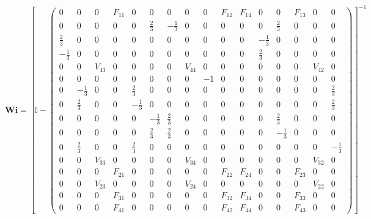 \[ \mathbf{Wi} =  \left[ \mathbb{I}  - \left(\begin{smallmatrix} 0 & 0 & 0 & F_{11} & 0 & 0 & 0 & 0 & 0 & F_{12} & F_{14} & 0 & 0 & F_{13} & 0 & 0 \\ 0 & 0 & 0 & 0 & 0 & \frac{2}{3} & -\frac{1}{3} & 0 & 0 & 0 & 0 & 0 & \frac{2}{3} & 0 & 0 & 0 \\ \frac{2}{3} & 0 & 0 & 0 & 0 & 0 & 0 & 0 & 0 & 0 & 0 & -\frac{1}{3} & 0 & 0 & 0 & 0 \\ -\frac{1}{3} & 0 & 0 & 0 & 0 & 0 & 0 & 0 & 0 & 0 & 0 & \frac{2}{3} & 0 & 0 & 0 & 0 \\ 0 & 0 & V_{43} & 0 & 0 & 0 & 0 & V_{44} & 0 & 0 & 0 & 0 & 0 & 0 & V_{42} & 0 \\ 0 & 0 & 0 & 0 & 0 & 0 & 0 & 0 & -1 & 0 & 0 & 0 & 0 & 0 & 0 & 0 \\ 0 & -\frac{1}{3} & 0 & 0 & \frac{2}{3} & 0 & 0 & 0 & 0 & 0 & 0 & 0 & 0 & 0 & 0 & \frac{2}{3} \\ 0 & \frac{2}{3} & 0 & 0 & -\frac{1}{3} & 0 & 0 & 0 & 0 & 0 & 0 & 0 & 0 & 0 & 0 & \frac{2}{3} \\ 0 & 0 & 0 & 0 & 0 & -\frac{1}{3} & \frac{2}{3} & 0 & 0 & 0 & 0 & 0 & \frac{2}{3} & 0 & 0 & 0 \\ 0 & 0 & 0 & 0 & 0 & \frac{2}{3} & \frac{2}{3} & 0 & 0 & 0 & 0 & 0 & -\frac{1}{3} & 0 & 0 & 0 \\ 0 & \frac{2}{3} & 0 & 0 & \frac{2}{3} & 0 & 0 & 0 & 0 & 0 & 0 & 0 & 0 & 0 & 0 & -\frac{1}{3} \\ 0 & 0 & V_{33} & 0 & 0 & 0 & 0 & V_{34} & 0 & 0 & 0 & 0 & 0 & 0 & V_{32} & 0 \\ 0 & 0 & 0 & F_{21} & 0 & 0 & 0 & 0 & 0 & F_{22} & F_{24} & 0 & 0 & F_{23} & 0 & 0 \\ 0 & 0 & V_{23} & 0 & 0 & 0 & 0 & V_{24} & 0 & 0 & 0 & 0 & 0 & 0 & V_{22} & 0 \\ 0 & 0 & 0 & F_{31} & 0 & 0 & 0 & 0 & 0 & F_{32} & F_{34} & 0 & 0 & F_{33} & 0 & 0 \\ 0 & 0 & 0 & F_{41} & 0 & 0 & 0 & 0 & 0 & F_{42} & F_{44} & 0 & 0 & F_{43} & 0 & 0 \end{smallmatrix}\right) \right]^{-1}  \]
